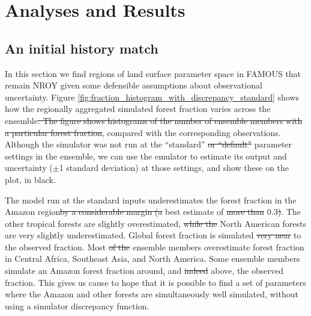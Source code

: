 \documentclass[esd, article]{copernicus} %
\providecommand{\DIFadd}[1]{{\protect\color{blue}\uwave{#1}}} %
\providecommand{\DIFdel}[1]{{\protect\color{red}\sout{#1}}}                      %
\providecommand{\DIFaddbegin}{} %
\providecommand{\DIFaddend}{} %
\providecommand{\DIFdelbegin}{} %
\providecommand{\DIFdelend}{} %
\begin{document}
\section{Analyses and Results}\label{AnalysesandResults}

\subsection{An initial history match}\label{ssec:initialhistorymatch}
In this section we find regions of land surface parameter space in FAMOUS that remain NROY given some defensible assumptions about observational uncertainty.  Figure \ref{fig:fraction_histogram_with_discrepancy_standard} shows how the regionally aggregated simulated forest fraction varies across the ensemble\DIFdelbegin \DIFdel{. The figure shows histograms of the number of ensemble members with a particular forest fraction}\DIFdelend , compared with the corresponding observations. Although the simulator was not run at the ``standard'' \DIFdelbegin \DIFdel{or ``default'' }\DIFdelend parameter settings in the ensemble, we can use the emulator to estimate its output and uncertainty ($\pm$1 standard deviation) at those settings, and show these on the plot, in black.

The model run at the standard inputs \DIFaddbegin \DIFadd{significantly }\DIFaddend underestimates the forest fraction in the Amazon region\DIFdelbegin \DIFdel{by a considerable margin (a }\DIFdelend \DIFaddbegin \DIFadd{, with a }\DIFaddend best estimate of \DIFdelbegin \DIFdel{more than }\DIFdelend \DIFaddbegin \DIFadd{>}\DIFaddend 0.3\DIFdelbegin \DIFdel{)}\DIFdelend . The other tropical forests are slightly overestimated, \DIFdelbegin \DIFdel{while the }\DIFdelend North American forests are very slightly underestimated. Global forest fraction is simulated \DIFdelbegin \DIFdel{very near }\DIFdelend \DIFaddbegin \DIFadd{close }\DIFaddend to the observed fraction. Most \DIFdelbegin \DIFdel{of the }\DIFdelend ensemble members overestimate forest fraction in Central Africa, Southeast Asia, and North America. Some ensemble members simulate an Amazon forest fraction around, and \DIFdelbegin \DIFdel{indeed }\DIFdelend above, the observed fraction. This gives us cause to hope that it is possible to find a set of parameters where the Amazon and other forests are simultaneously well simulated, without using a simulator discrepancy function. 


\end{document}
